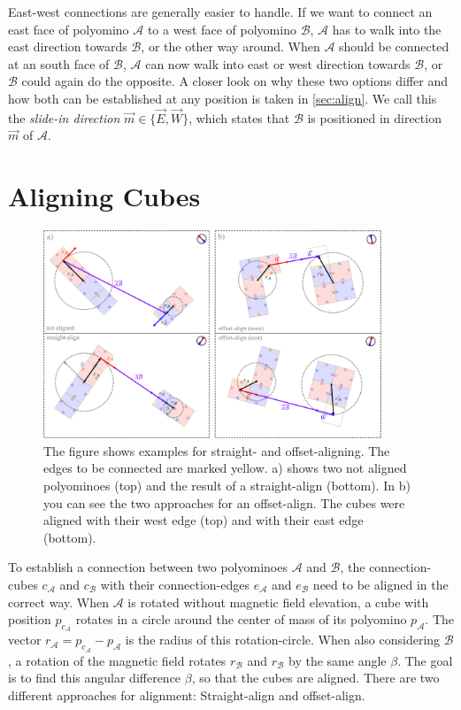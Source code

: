 East-west connections are generally easier to handle.
If we want to connect an east face of polyomino $\mathcal{A}$ to a west face of polyomino $\mathcal{B}$, $\mathcal{A}$ has to walk into the east direction towards $\mathcal{B}$, or the other way around.
When $\mathcal{A}$ should be connected at an south face of $\mathcal{B}$, $\mathcal{A}$ can now walk into east or west direction towards $\mathcal{B}$, or $\mathcal{B}$ could again do the opposite.
A closer look on why these two options differ and how both can be established at any position is taken in \autoref{sec:align}.
We call this the \textit{slide-in direction} $\vec{m} \in \{\vec{E}, \vec{W}\}$, which states that $\mathcal{B}$ is positioned in direction $\vec{m}$ of $\mathcal{A}$.


\section{Aligning Cubes}
\label{sec:align}

\begin{figure}
	\centering
	\includegraphics[width=0.90\textwidth]{figures/aligning.pdf}
	\caption[Illustration of straight- and offset-aligning]{The figure shows examples for straight- and offset-aligning. The edges to be connected are marked yellow. a) shows two not aligned polyominoes (top) and the result of a straight-align (bottom). In b) you can see the two approaches for an offset-align. The cubes were aligned with their west edge (top) and with their east edge (bottom).}
	\label{fig:aligning}
\end{figure}

To establish a connection between two polyominoes $\mathcal{A}$ and $\mathcal{B}$, the connection-cubes $c_\mathcal{A}$ and $c_\mathcal{B}$ with their connection-edges $e_\mathcal{A}$ and $e_\mathcal{B}$ need to be aligned in the correct way.
When $\mathcal{A}$ is rotated without magnetic field elevation, a cube with position $p_{c_\mathcal{A}}$ rotates in a circle around the center of mass of its polyomino $p_\mathcal{A}$.
The vector $r_\mathcal{A} = p_{c_\mathcal{A}} - p_\mathcal{A}$ is the radius of this rotation-circle.
When also considering $\mathcal{B}$, a rotation of the magnetic field rotates $r_\mathcal{B}$ and $r_\mathcal{B}$ by the same angle $\beta$.
The goal is to find this angular difference $\beta$, so that the cubes are aligned.
There are two different approaches for alignment: Straight-align and offset-align.

